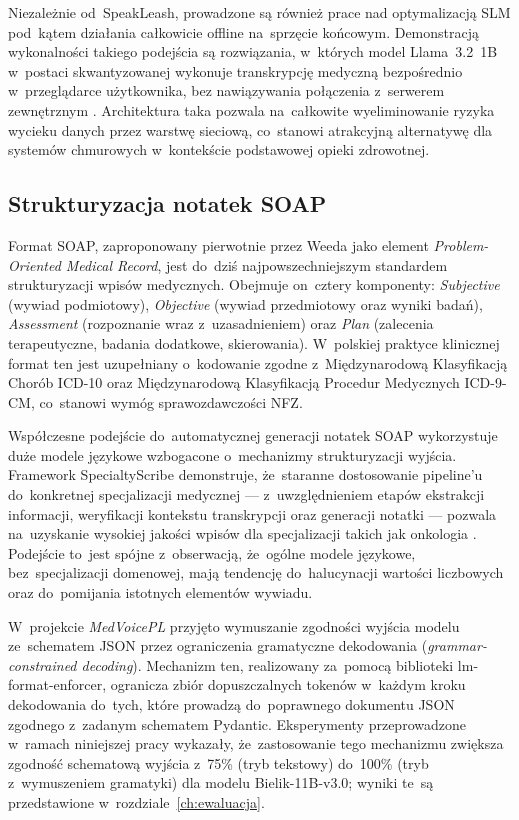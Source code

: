 Niezależnie od~SpeakLeash, prowadzone są również prace nad
optymalizacją SLM pod~kątem działania całkowicie offline na~sprzęcie
końcowym. Demonstracją wykonalności takiego podejścia są rozwiązania,
w~których model Llama~3.2~1B w~postaci skwantyzowanej wykonuje
transkrypcję medyczną bezpośrednio w~przeglądarce użytkownika, bez
nawiązywania połączenia z~serwerem zewnętrznym \parencite{ondeviceasrllama}.
Architektura taka pozwala na~całkowite wyeliminowanie ryzyka wycieku
danych przez warstwę sieciową, co~stanowi atrakcyjną alternatywę dla
systemów chmurowych w~kontekście podstawowej opieki zdrowotnej.

\subsection{Strukturyzacja notatek SOAP}

Format SOAP, zaproponowany pierwotnie przez Weeda
\parencite{weed1968soap} jako element \emph{Problem-Oriented Medical
Record}, jest do~dziś najpowszechniejszym standardem strukturyzacji
wpisów medycznych. Obejmuje on~cztery komponenty: \emph{Subjective}
(wywiad podmiotowy), \emph{Objective} (wywiad przedmiotowy oraz
wyniki badań), \emph{Assessment} (rozpoznanie wraz z~uzasadnieniem)
oraz \emph{Plan} (zalecenia terapeutyczne, badania dodatkowe,
skierowania). W~polskiej praktyce klinicznej format ten jest
uzupełniany o~kodowanie zgodne z~Międzynarodową Klasyfikacją Chorób
ICD-10 oraz Międzynarodową Klasyfikacją Procedur Medycznych
ICD-9-CM, co~stanowi wymóg sprawozdawczości NFZ.

Współczesne podejście do~automatycznej generacji notatek SOAP
wykorzystuje duże modele językowe wzbogacone o~mechanizmy
strukturyzacji wyjścia. Framework SpecialtyScribe demonstruje,
że~staranne dostosowanie pipeline'u do~konkretnej specjalizacji
medycznej --- z~uwzględnieniem etapów ekstrakcji informacji,
weryfikacji kontekstu transkrypcji oraz generacji notatki ---
pozwala na~uzyskanie wysokiej jakości wpisów dla specjalizacji
takich jak onkologia \parencite{specialtyscribe2025}. Podejście to~jest
spójne z~obserwacją, że~ogólne modele językowe, bez~specjalizacji
domenowej, mają tendencję do~halucynacji wartości liczbowych oraz
do~pomijania istotnych elementów wywiadu.

W~projekcie \emph{MedVoicePL} przyjęto wymuszanie zgodności wyjścia
modelu ze~schematem JSON przez ograniczenia gramatyczne dekodowania
(\emph{grammar-constrained decoding}). Mechanizm ten, realizowany
za~pomocą biblioteki lm-format-enforcer, ogranicza zbiór dopuszczalnych
tokenów w~każdym kroku dekodowania do~tych, które prowadzą
do~poprawnego dokumentu JSON zgodnego z~zadanym schematem Pydantic.
Eksperymenty przeprowadzone w~ramach niniejszej pracy wykazały,
że~zastosowanie tego mechanizmu zwiększa zgodność schematową
wyjścia z~75\% (tryb tekstowy) do~100\% (tryb z~wymuszeniem
gramatyki) dla modelu Bielik-11B-v3.0; wyniki te~są przedstawione
w~rozdziale~\ref{ch:ewaluacja}.

